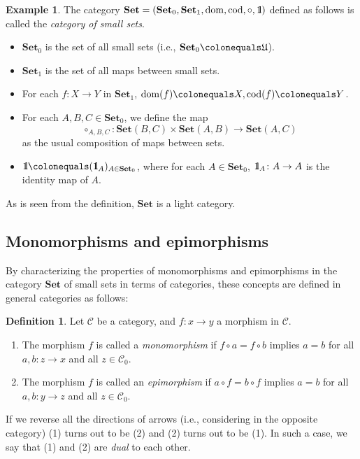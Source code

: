 \documentclass{surv-l}
\numberwithin{equation}{chapter}
\numberwithin{figure}{chapter}
\theoremstyle{plain}
\theoremstyle{definition}
\newtheorem{dfn}[thm]{Definition}
\newtheorem{exm}[thm]{Example}
\theoremstyle{remark}
\newcommand{\id}{1\kern-.25em{\text{{\rm l}}}}
\DeclareMathOperator{\dom}{dom}
\DeclareMathOperator{\cod}{cod}
\begin{document}
\begin{exm}\label{exm:set}
The category $\mathbf{Set} =(\mathbf{Set}_0, \mathbf{Set}_1, \dom, \cod, \circ, \id)$ defined as follows is called
the \emph{category of small sets}.
\begin{itemize}
 \item
$\mathbf{Set}_0$ is the set of all small sets (i.e., $\mathbf{Set}_0\colonequals  \mathfrak{U}$).
\item
$\mathbf{Set}_1$ is the set of all maps between small sets.
\item
For each $f \colon X \to Y$ in $\mathbf{Set}_1$, $\dom(f)\colonequals X, \cod(f)\colonequals Y$.
\item
For each $A,B,C \in \mathbf{Set}_0$, we define the map
\[
\circ_{A,B,C}\colon \mathbf{Set}(B,C) \times \mathbf{Set}(A,B) \to \mathbf{Set}(A, C)
\]
as the usual composition of maps between sets.
\item
$\id\colonequals  (\id_A)_{A \in \mathbf{Set}_0}$, where
for each $A \in \mathbf{Set}_0$, $\id_A \colon A \to A$ is the identity map of $A$.
\end{itemize}
As is seen from the definition, $\mathbf{Set}$ is a light category.
\end{exm}

\subsection{Monomorphisms and epimorphisms}
By characterizing the properties of monomorphisms and epimorphisms in the category $\mathbf{Set}$
of small sets in terms of categories,
these concepts are defined in general categories as follows:

\begin{dfn}\label{dfn:mon-epi}
Let ${\mathcal{C}}$ be a category, and $f \colon x \to y$ a morphism in ${\mathcal{C}}$.
\begin{enumerate}
\item
The morphism $f$ is called a \emph{monomorphism} if
$f \circ a = f \circ b$ implies $a = b$ for all $a, b \colon z \to x$ and all $z \in {\mathcal{C}}_0$.
\item
The morphism $f$ is called an \emph{epimorphism} if
$a \circ f = b \circ f$ implies $a = b$ for all $a, b \colon y \to z$ and all $z \in {\mathcal{C}}_0$.
\end{enumerate}
If we reverse all the directions of arrows (i.e., considering in the opposite category)
(1) turns out to be (2) and (2) turns out to be (1).
In such a case, we say that (1) and (2) are \emph{dual} to each other.
\end{dfn}
\end{document}
